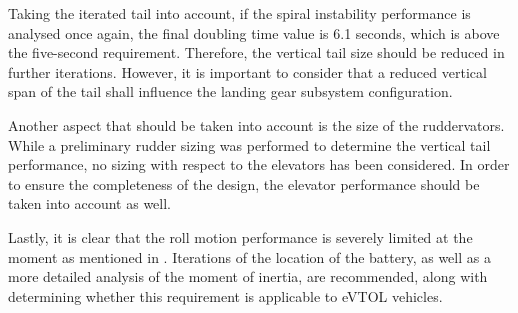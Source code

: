 Taking the iterated tail into account, if the spiral instability performance is analysed once again, the final doubling time value is 6.1 seconds, which is above the five-second requirement.
Therefore, the vertical tail size should be reduced in further iterations.
However, it is important to consider that a reduced vertical span of the tail shall influence the landing gear subsystem configuration.

Another aspect that should be taken into account is the size of the ruddervators.
While a preliminary rudder sizing was performed to determine the vertical tail performance, no sizing with respect to the elevators has been considered. In order to ensure the completeness of the design, the elevator performance should be taken into account as well.

Lastly, it is clear that the roll motion performance is severely limited at the moment as mentioned in .
Iterations of the location of the battery, as well as a more detailed analysis of the moment of inertia, are recommended, along with determining whether this requirement is applicable to eVTOL vehicles.
